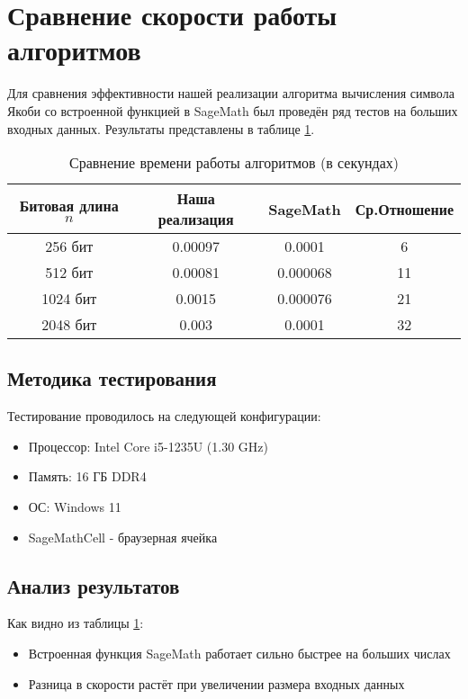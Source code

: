 \documentclass[12pt,a4paper]{article}
\begin{document}
\section{Сравнение скорости работы алгоритмов}

Для сравнения эффективности нашей реализации алгоритма вычисления символа Якоби со встроенной функцией в SageMath был проведён ряд тестов на больших входных данных. Результаты представлены в таблице \ref{table:speed_comparison}.

\begin{table}[h]
\centering
\caption{Сравнение времени работы алгоритмов (в секундах)}
\label{table:speed_comparison}
\begin{tabular}{|c|c|c|c|}
\hline
Битовая длина $n$ & Наша реализация & SageMath & Ср.Отношение \\ 
\hline
256 бит & 0.00097 & 0.0001 & 6 \\
512 бит  & 0.00081 & 0.000068 & 11 \\
1024 бит  & 0.0015 &  0.000076 & 21 \\
2048 бит  & 0.003 & 0.0001 & 32 \\

\hline
\end{tabular}
\end{table}

\subsection{Методика тестирования}

Тестирование проводилось на следующей конфигурации:
\begin{itemize}
\item Процессор: Intel Core i5-1235U (1.30 GHz)
\item Память: 16 ГБ DDR4
\item ОС: Windows 11
\item SageMathCell - браузерная ячейка
\end{itemize}

\subsection{Анализ результатов}

Как видно из таблицы \ref{table:speed_comparison}:
\begin{itemize}
\item Встроенная функция SageMath работает сильно быстрее на больших числах
\item Разница в скорости растёт при увеличении размера входных данных

\end{itemize}
\end{document}
